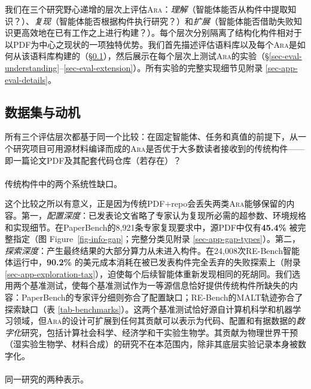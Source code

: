 \documentclass[
]{article}
\makeatletter
\let\oldparagraph\paragraph
\renewcommand{\paragraph}{
    \@ifstar
      \xxxParagraphStar
      \xxxParagraphNoStar
  }
\newcommand{\xxxParagraphStar}[1]{\oldparagraph*{#1}\mbox{}}
\newcommand{\xxxParagraphNoStar}[1]{\oldparagraph{#1}\mbox{}}
\theoremstyle{definition}
\newcommand{\ara}{\textsc{Ara}}
\makeatother
\begin{document}
我们在三个研究野心递增的层次上评估\ara{}：\emph{理解}（智能体能否从构件中提取知识？）、\emph{复现}（智能体能否根据构件执行研究？）和\emph{扩展}（智能体能否借助失败知识更高效地在已有工作之上进行构建？）。每个层次分别隔离了结构化构件相对于以PDF为中心之现状的一项独特优势。我们首先描述评估语料库以及每个\ara{}是如何从该语料库构建的（\S\ref{sec-eval-data}），然后展示在每个层次上测试\ara{}的实验（\S\ref{sec-eval-understanding}--\ref{sec-eval-extension}）。所有实验的完整实现细节见附录
\ref{sec-app-eval-details}。

\subsection{数据集与动机}\label{sec-eval-data}

所有三个评估层次都基于同一个比较：在固定智能体、任务和真值的前提下，从一个研究项目可用源材料编译而成的\ara{}是否优于大多数读者接收到的传统构件------即一篇论文PDF及其配套代码仓库（若存在）？

\paragraph{传统构件中的两个系统性缺口。}\label{ux4f20ux7edfux6784ux4ef6ux4e2dux7684ux4e24ux4e2aux7cfbux7edfux6027ux7f3aux53e3}

这个比较之所以有意义，正是因为传统PDF\(+\)repo会丢失两类\ara{}能够保留的内容。第一，\emph{配置深度}：已发表论文省略了专家认为复现所必需的超参数、环境规格和实现细节。在PaperBench的8,921条专家复现要求中，源PDF中仅有\textbf{45.4\%}
被完整指定（图 Figure~\ref{fig-info-gap}；完整分类见附录
\ref{sec-app-gap-types}）。第二，\emph{探索深度}：产生最终结果的大部分算力从未进入构件。在24,008次RE-Bench智能体运行中，\textbf{90.2\%}
的美元成本消耗在被已发表构件完全丢弃的失败探索上（附录
\ref{sec-app-exploration-tax}），迫使每个后续智能体重新发现相同的死胡同。我们选用两个基准测试，使每个基准测试作为一等源信息恰好提供传统构件所缺失的内容：PaperBench的专家评分细则弥合了配置缺口；RE-Bench的MALT轨迹弥合了探索缺口（表
\ref{tab-benchmarks}）。这两个基准测试恰好源自计算机科学和机器学习领域，但\ara{}的设计可扩展到任何其贡献可以表示为代码、配置和有据数据的\emph{数字化}研究，包括计算社会科学、经济学和干实验生物学。其贡献为物理世界干预（湿实验生物学、材料合成）的研究不在本范围内，除非其底层实验记录本身被数字化。

\paragraph{同一研究的两种表示。}\label{ux540cux4e00ux7814ux7a76ux7684ux4e24ux79cdux8868ux793a}
\end{document}

